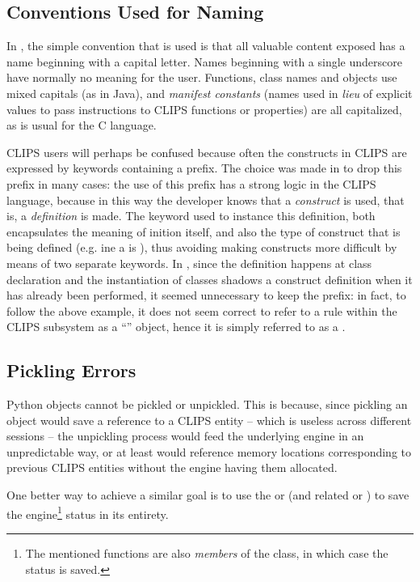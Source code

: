 \subsection{Conventions Used for Naming\label{pyclips-ov-names}}

In \pyclips{}, the simple convention that is used is that all valuable
content exposed has a name beginning with a capital letter. Names
beginning with a single underscore have normally no meaning for the
\pyclips{} user. Functions, class names and objects use mixed capitals
(as in Java), and \emph{manifest constants} (names used in \emph{lieu}
of explicit values to pass instructions to CLIPS functions or
properties) are all capitalized, as is usual for the C language.

CLIPS users will perhaps be confused because often the constructs in
CLIPS are expressed by keywords containing a  prefix. The
choice was made in \pyclips{} to drop this prefix in many cases: the use
of this prefix has a strong logic in the CLIPS language, because in this
way the developer knows that a \emph{construct} is used, that is, a
\emph{definition} is made. The keyword used to instance this definition,
both encapsulates the meaning of inition itself, and also
the type of construct that is being defined (e.g. ine a
 is ), thus avoiding making constructs more
difficult by means of two separate keywords. In \pyclips{}, since the
definition happens at class declaration and the instantiation of classes
shadows a construct definition when it has already been performed, it
seemed unnecessary to keep the prefix: in fact, to follow the above
example, it does not seem correct to refer to a rule within the CLIPS
subsystem as a ``'' object, hence it is simply referred
to as a .


\subsection{Pickling Errors\label{pyclips-ov-pickle}}

Python objects cannot be pickled or unpickled. This is because, since
pickling an object would save a reference to a CLIPS entity -- which is
useless across different \pyclips{} sessions -- the unpickling process
would feed the underlying engine in an unpredictable way, or at least
would reference memory locations corresponding to previous CLIPS entities
without the engine having them allocated.

One better way to achieve a similar goal is to use the 
or  (and related  or )
to save the engine\footnote{The mentioned functions are also \emph{members}
of the  class, in which case the 
status is saved.} status in its entirety.

